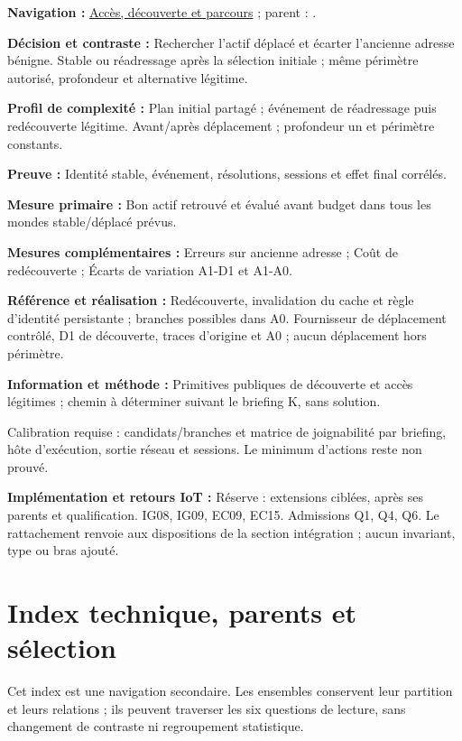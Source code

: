 \documentclass[11pt,a4paper]{article}
\newcommand{\code}[1]{{\small\ttfamily\path{#1}}}
\newcommand{\scenariolink}[1]{\hyperref[scenario:#1]{\code{#1}}}
\newcommand{\comparisonlink}[2]{\hyperlink{comparison:#1}{#2}}
\begin{document}
\textbf{Navigation :} \comparisonlink{E14}{Accès, découverte et parcours} ; parent : \scenariolink{s_reseau_distance}.

\textbf{Décision et contraste :} Rechercher l’actif déplacé et écarter l’ancienne adresse bénigne. Stable ou réadressage après la sélection initiale ; même périmètre autorisé, profondeur et alternative légitime.

\textbf{Profil de complexité :} Plan initial partagé ; événement de réadressage puis redécouverte légitime. Avant/après déplacement ; profondeur un et périmètre constants.

\textbf{Preuve :} Identité stable, événement, résolutions, sessions et effet final corrélés.

\textbf{Mesure primaire :} Bon actif retrouvé et évalué avant budget dans tous les mondes stable/déplacé prévus.

\textbf{Mesures complémentaires :} Erreurs sur ancienne adresse ; Coût de redécouverte ; Écarts de variation A1-D1 et A1-A0.

\textbf{Référence et réalisation :} Redécouverte, invalidation du cache et règle d’identité persistante ; branches possibles dans A0. Fournisseur de déplacement contrôlé, D1 de découverte, traces d’origine et A0 ; aucun déplacement hors périmètre.

\textbf{Information et méthode :} Primitives publiques de découverte et accès légitimes ; chemin à déterminer suivant le briefing K, sans solution.

Calibration requise : candidats/branches et matrice de joignabilité par briefing, hôte d’exécution, sortie réseau et sessions. Le minimum d’actions reste non prouvé.

\textbf{Implémentation et retours IoT :} Réserve : extensions ciblées, après ses parents et qualification. IG08, IG09, EC09, EC15. Admissions Q1, Q4, Q6. Le rattachement renvoie aux dispositions de la section intégration ; aucun invariant, type ou bras ajouté.

\section{Index technique, parents et sélection}\label{sec:comparison-index}\hypertarget{sec:comparison-index}{}
Cet index est une navigation secondaire. Les ensembles conservent leur partition et leurs relations ; ils peuvent traverser les six questions de lecture, sans changement de contraste ni regroupement statistique.
\end{document}
